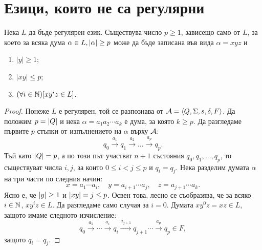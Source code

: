 \section{Езици, които не са регулярни}
\begin{lemma}
  \label{lem:pumping-reg}
  Нека $L$ да бъде регулярен език.
  Съществува число $p\geq 1$, зависещо само от $L$, 
  за което за всяка дума $\alpha\in L, \lvert{\alpha}\rvert\geq p$ може да 
  бъде записана във вида $\alpha = xyz$ и 
  \begin{enumerate}[1)]
  \item
    $|y|\geq 1$;
  \item
    $|xy|\leq p$;
  \item
    $(\forall i\in\mathbb{N})[xy^iz \in L]$.
  \end{enumerate}
\end{lemma}
\begin{proof}
  Понеже $L$ е регулярен, той се разпознава от $\mathcal{A} = \langle{Q,\Sigma,s,\delta,F}\rangle$.
  Да положим $p = \lvert{Q}\rvert$ и нека $\alpha = a_1a_2\cdots a_k$ е дума, за която $k \geq p$.
  Да разгледаме първите $p$ стъпки от изпълнението на $\alpha$ върху $\mathcal{A}$:
  \[q_0\stackrel{a_1}{\rightarrow} q_1 \stackrel{a_2}{\rightarrow} \dots \stackrel{a_p}{\rightarrow} q_p.\]
  Тъй като $\lvert{Q}\rvert = p$, а по този път участват $n+1$ състояния $q_0,q_1,\dots,q_p$,
  то съществуват числа $i, j$, за които $0\leq i < j\leq p$ и $q_i = q_j$.
  Нека разделим думата $\alpha$ на три части по следния начин:
  \[x = a_1\cdots a_i,\quad y = a_{i+1}\cdots a_j,\quad z = a_{j+1}\cdots a_k.\]
  Ясно е, че $\lvert{y}\rvert \geq 1$ и $\lvert{xy}\rvert = j \leq p$.
  Освен това, лесно се съобразява, че за всяко $i \in\mathbb{N}$,
  $xy^iz \in L$. Да разгледаме само случая за $i = 0$.
  Думата $xy^0z = xz \in L$, защото имаме следното изчисление:
  \[q_0\stackrel{a_1}{\rightarrow} \cdots \stackrel{a_i}{\rightarrow} q_i\stackrel{a_{j+1}}{\rightarrow}q_{j+1}\cdots\stackrel{a_{p}}{\rightarrow}q_p\in F,\]
  защото $q_i = q_j$.
\end{proof}


